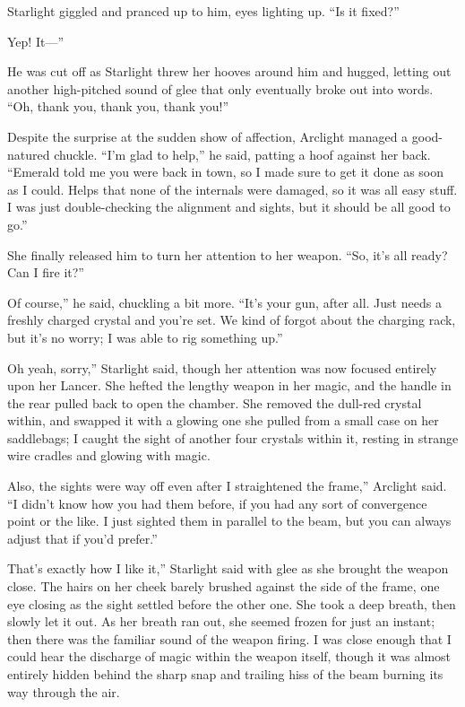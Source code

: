 Starlight giggled and pranced up to him, eyes lighting up. “Is it fixed?”

\leavevmode{}Yep! It—”

He was cut off as Starlight threw her hooves around him and hugged, letting out another high-pitched sound of glee that only eventually broke out into words. “Oh, thank you, thank you, thank you!”

Despite the surprise at the sudden show of affection, Arclight managed a good-natured chuckle. “I’m glad to help,” he said, patting a hoof against her back. “Emerald told me you were back in town, so I made sure to get it done as soon as I could. Helps that none of the internals were damaged, so it was all easy stuff. I was just double-checking the alignment and sights, but it should be all good to go.”

She finally released him to turn her attention to her weapon. “So, it’s all ready? Can I fire it?”

\leavevmode{}Of course,” he said, chuckling a bit more. “It’s your gun, after all. Just needs a freshly charged crystal and you’re set. We kind of forgot about the charging rack, but it’s no worry; I was able to rig something up.”

\leavevmode{}Oh yeah, sorry,” Starlight said, though her attention was now focused entirely upon her Lancer. She hefted the lengthy weapon in her magic, and the handle in the rear pulled back to open the chamber. She removed the dull-red crystal within, and swapped it with a glowing one she pulled from a small case on her saddlebags; I caught the sight of another four crystals within it, resting in strange wire cradles and glowing with magic.

\leavevmode{}Also, the sights were way off even after I straightened the frame,” Arclight said. “I didn’t know how you had them before, if you had any sort of convergence point or the like. I just sighted them in parallel to the beam, but you can always adjust that if you’d prefer.”

\leavevmode{}That’s exactly how I like it,” Starlight said with glee as she brought the weapon close. The hairs on her cheek barely brushed against the side of the frame, one eye closing as the sight settled before the other one. She took a deep breath, then slowly let it out. As her breath ran out, she seemed frozen for just an instant; then there was the familiar sound of the weapon firing. I was close enough that I could hear the discharge of magic within the weapon itself, though it was almost entirely hidden behind the sharp snap and trailing hiss of the beam burning its way through the air.

